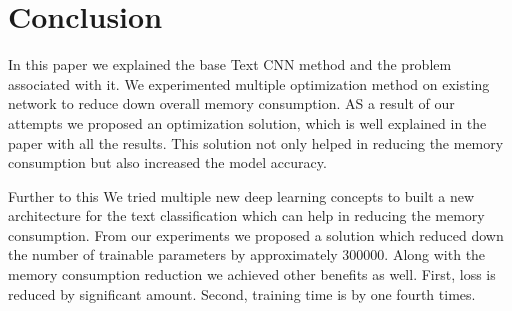 \documentclass[conference]{IEEEtran}
\begin{document}
\section{Conclusion}
In this paper we explained the base Text CNN method and the problem associated with it. We experimented multiple optimization method on existing network to reduce down overall memory consumption. AS a result of our attempts we proposed an optimization solution, which is well explained in the paper with all the results. This solution not only helped in reducing the memory consumption but also increased the model accuracy. 

Further to this We tried multiple new deep learning concepts to built a new architecture for the text classification which can help in reducing the memory consumption. From our experiments we proposed a solution which reduced down the number of trainable parameters by approximately 300000. Along with the memory consumption reduction we achieved other benefits as well. First, loss is reduced by significant amount. Second, training time is by one fourth times.

  \nocite{*}
  
  
\end{document}
